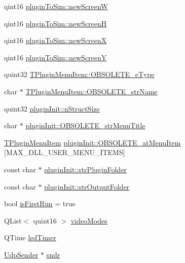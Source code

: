 \begin{DoxyCompactItemize}
qint16 \hyperlink{group___aero_sim_r_c_ga73893f1a06af3481486ee34ef91001c0}{plugin\-To\-Sim\-::new\-Screen\-W}
\item 
qint16 \hyperlink{group___aero_sim_r_c_ga6ac6931958ba1a74ff06dbfe7dba5676}{plugin\-To\-Sim\-::new\-Screen\-H}
\item 
qint16 \hyperlink{group___aero_sim_r_c_gacb23e684331322adcce5771dc717ea18}{plugin\-To\-Sim\-::new\-Screen\-X}
\item 
qint16 \hyperlink{group___aero_sim_r_c_gad5aa10f7542e0fcf3d4ac3981efc93a2}{plugin\-To\-Sim\-::new\-Screen\-Y}
\item 
quint32 \hyperlink{group___aero_sim_r_c_ga3182cdcc989c86e02f89dfc950a2d11e}{\-T\-Plugin\-Menu\-Item\-::\-O\-B\-S\-O\-L\-E\-T\-E\-\_\-e\-Type}
\item 
char $\ast$ \hyperlink{group___aero_sim_r_c_ga99ed050ca0dfe8088a93046f72c044e7}{\-T\-Plugin\-Menu\-Item\-::\-O\-B\-S\-O\-L\-E\-T\-E\-\_\-str\-Name}
\item 
quint32 \hyperlink{group___aero_sim_r_c_ga52e8965004a5543170823fdb54bee470}{plugin\-Init\-::n\-Struct\-Size}
\item 
char $\ast$ \hyperlink{group___aero_sim_r_c_ga03438bb42beb3367394a89c5f8b0d721}{plugin\-Init\-::\-O\-B\-S\-O\-L\-E\-T\-E\-\_\-str\-Menu\-Title}
\item 
\hyperlink{struct_t_plugin_menu_item}{\-T\-Plugin\-Menu\-Item} \hyperlink{group___aero_sim_r_c_ga587ecda1e1922299d622d31bf15c9f78}{plugin\-Init\-::\-O\-B\-S\-O\-L\-E\-T\-E\-\_\-at\-Menu\-Item} \mbox{[}\-M\-A\-X\-\_\-\-D\-L\-L\-\_\-\-U\-S\-E\-R\-\_\-\-M\-E\-N\-U\-\_\-\-I\-T\-E\-M\-S\mbox{]}
\item 
const char $\ast$ \hyperlink{group___aero_sim_r_c_ga1ea4ae7485e88859f164a5e904600834}{plugin\-Init\-::str\-Plugin\-Folder}
\item 
const char $\ast$ \hyperlink{group___aero_sim_r_c_ga9149810daf40b3b4e5f706faaa8dcc8f}{plugin\-Init\-::str\-Output\-Folder}
\item 
bool \hyperlink{group___aero_sim_r_c_gae612ff4fcd9d86f5ce097c2583d2bfee}{is\-First\-Run} = true
\item 
\-Q\-List$<$ quint16 $>$ \hyperlink{group___aero_sim_r_c_ga56a26014d5fb746423472ca6301beff3}{video\-Modes}
\item 
\-Q\-Time \hyperlink{group___aero_sim_r_c_ga56b5b977fe04df5bdb2e4ea63b385692}{led\-Timer}
\item 
\hyperlink{class_udp_sender}{\-Udp\-Sender} $\ast$ \hyperlink{group___aero_sim_r_c_ga74a874f84e60aa753bdb56cd47d55d8b}{sndr}
\item 

\end{DoxyCompactItemize}
